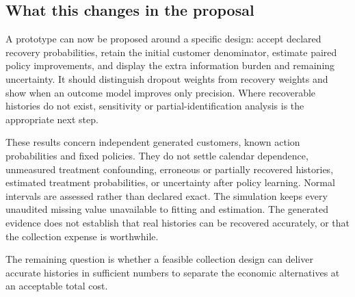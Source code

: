 \subsection{What this changes in the proposal}
A prototype can now be proposed around a specific design: accept declared
recovery probabilities, retain the initial customer denominator, estimate
paired policy improvements, and display the extra information burden and
remaining uncertainty. It should distinguish dropout weights from recovery
weights and show when an outcome model improves only precision. Where
recoverable histories do not exist, sensitivity or partial-identification
analysis is the appropriate next step.

These results concern independent generated customers, known action
probabilities and fixed policies. They do not settle calendar dependence,
unmeasured treatment confounding, erroneous or partially recovered histories,
estimated treatment probabilities, or uncertainty after policy learning.
Normal intervals are assessed rather than declared exact. The simulation
keeps every unaudited missing value unavailable to fitting and estimation.
The generated evidence does not establish that real histories can be
recovered accurately, or that the collection expense is worthwhile.

The remaining question is whether a feasible collection design can deliver
accurate histories in sufficient numbers to separate the economic
alternatives at an acceptable total cost.
